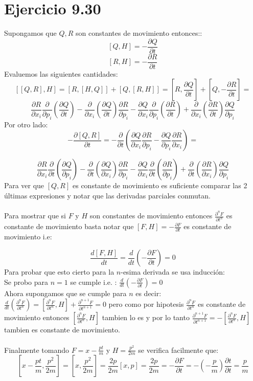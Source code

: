 \documentclass[letterpaper,10pt]{article}
\begin{document}
\section*{Ejercicio 9.30}
Supongamos que $Q, R$ son constantes de movimiento entonces::
$$[Q,H]=-\frac{\partial Q}{\partial t}$$
$$[R,H]=-\frac{\partial R}{\partial t}$$
Evaluemos las siguientes cantidades:
$$[[Q,R],H]=[R,[H,Q]]+[Q,[R,H]]=[R,\frac{\partial Q}{\partial t}]+[Q,-\frac{\partial R}{\partial t}]=$$
$$\frac{\partial R}{\partial x_i}\frac{\partial }{\partial p_i}\left(\frac{\partial Q}{\partial t} \right)-\frac{\partial}{\partial x_i} \left(\frac{\partial Q}{\partial t} \right) \frac{\partial  R }{\partial p_i}-\frac{\partial Q}{\partial x_i}\frac{\partial }{\partial p_i}\left(\frac{\partial R}{\partial t} \right)+\frac{\partial}{\partial x_i} \left(\frac{\partial R}{\partial t} \right) \frac{\partial  Q }{\partial p_i}$$
Por otro lado:
$$-\frac{\partial [Q,R]}{\partial t}=-\frac{\partial }{\partial t}\left( 
\frac{\partial Q}{\partial x_i}\frac{\partial R}{\partial p_i}-\frac{\partial Q}{\partial p_i}\frac{\partial R}{\partial x_i} \right)=
$$


$$\frac{\partial R}{\partial x_i}\frac{\partial }{\partial t}\left(\frac{\partial Q}{\partial p_i} \right)-\frac{\partial}{\partial t} \left(\frac{\partial Q}{\partial x_i} \right) \frac{\partial  R }{\partial p_i}-\frac{\partial Q}{\partial x_i}\frac{\partial }{\partial t}\left(\frac{\partial R}{\partial p_i} \right)+\frac{\partial}{\partial t} \left(\frac{\partial R}{\partial x_i} \right) \frac{\partial  Q }{\partial p_i}
$$
Para ver que $[Q,R]$ es constante de movimiento es suficiente comparar las 2 \'ultimas expresiones y notar que las derivadas parciales conmutan.
\\
\\
Para mostrar que si $F$ y $H$ son constantes de movimiento entonces $\frac{\partial^n F}{\partial t^n}$ es constante de movimiento basta notar que $[F,H]=-\frac{\partial F}{\partial t}$ es constante de movimiento i.e:

$$ \frac{d[F,H]}{dt}=\frac{d}{dt}\left ( -\frac{\partial F}{\partial t} \right)=0$$
Para probar que esto cierto para la $n$-esima derivada se usa inducci\'on:\\
Se probo para $n=1$ se cumple i.e. : $\frac{d}{dt}\left ( -\frac{\partial F}{\partial t} \right)=0$\\
Ahora supongamos que se cumple para $n$ es decir: $\frac{d}{dt}\left (\frac{\partial^n F}{\partial t^n} \right)=[\frac{\partial^n F}{\partial t^n},H]+\frac{\partial^{n+1} F}{\partial t^{n+1}}=0$ pero como por hipotesis $\frac{\partial^n F}{\partial t^n}$ es constante de movimiento entonces $[\frac{\partial^n F}{\partial t^n},H]$ tambien lo es y por lo tanto $\frac{\partial^{n+1} F}{\partial t^{n+1}}=-[\frac{\partial^n F}{\partial t^n},H]$ tambien es constante de movimiento.
\\
\\
Finalmente tomando $F=x-\frac{pt}{m}$ y $H=\frac{p^2}{2m}$ se verifica facilmente que:
$$[x-\frac{pt}{m},\frac{p^2}{2m}]=[x,\frac{p^2}{2m}]=\frac{2p}{2m}[x,p]=\frac{2p}{2m}=-\frac{\partial F}{\partial t}=-(-\frac{p}{m})\frac{\partial t}{\partial t}=\frac{p}{m}$$
\end{document}
